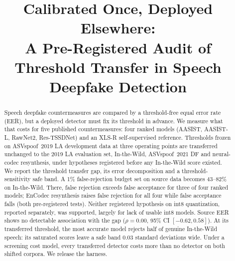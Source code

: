 \documentclass[conference]{IEEEtran}
\newif\ifblind
\newcommand{\todo}[1]{\textcolor{red}{[#1]}}
\begin{document}
\title{Calibrated Once, Deployed Elsewhere:\\ A Pre-Registered Audit of
Threshold Transfer in Speech Deepfake Detection}

\ifblind
\author{\IEEEauthorblockN{Anonymous submission}}
\else
\author{
\IEEEauthorblockA{\todo{affiliation}\\
\todo{e-mail}}}
\fi

\maketitle

\begin{abstract}
Speech deepfake countermeasures are compared by a threshold-free equal error
rate (EER), but a deployed detector must fix its threshold in advance. We
measure what that costs for five published countermeasures: four ranked models
(AASIST, AASIST-L, RawNet2, Res-TSSDNet) and an XLS-R self-supervised
reference. Thresholds frozen on ASVspoof~2019 LA development data at three
operating points are transferred unchanged to the 2019 LA evaluation set,
In-the-Wild, ASVspoof~2021 DF and neural-codec resynthesis, under hypotheses
registered before any In-the-Wild score existed. We report the threshold
transfer gap, its error decomposition and a threshold-sensitivity safe band. A
1\% false-rejection budget set on source data becomes 43--82\% on In-the-Wild.
There, false rejection exceeds false acceptance for three of four ranked models;
EnCodec resynthesis raises false rejection for all four while false acceptance
falls (both pre-registered tests). Neither registered hypothesis on int8
quantization, reported separately, was supported, largely for lack of usable
int8 models. Source EER shows no detectable association with the gap
(\(\rho=0.00\), 95\% CI \([-0.62,0.58]\)). At its transferred threshold, the
most accurate model rejects half of genuine In-the-Wild speech: its saturated
scores leave a safe band 0.03 standard deviations wide. Under a screening cost
model, every transferred detector costs more than no detector on both shifted
corpora. We release the harness.
\end{abstract}
\end{document}
